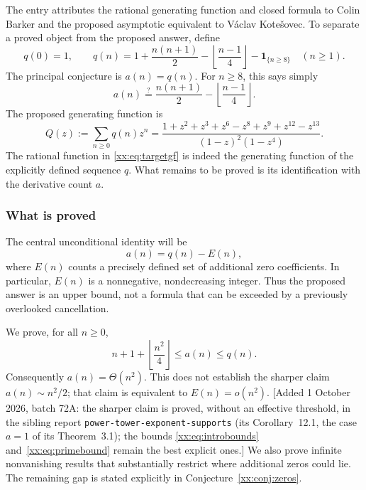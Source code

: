 \documentclass[11pt,a4paper]{article}
\numberwithin{equation}{section}
\theoremstyle{definition}
\theoremstyle{remark}
\theoremstyle{plain}
\newcommand{\ind}[1]{\mathbf{1}_{\{#1\}}}
\newcommand{\sibPTE}{\texttt{power-\allowbreak{}tower-\allowbreak{}exponent-\allowbreak{}supports}}
\begin{document}
The entry attributes the rational generating function and closed formula to
Colin Barker and the proposed asymptotic equivalent to V\'aclav
Kote\v{s}ovec. To separate a proved object from the proposed answer, define
\begin{equation}\label{xx:eq:q}
 q(0)=1,\qquad
 q(n)=1+\frac{n(n+1)}2-\left\lfloor\frac{n-1}{4}\right\rfloor
             -\ind{n\ge8}\quad(n\ge1).
\end{equation}
The principal conjecture is $a(n)=q(n)$. For $n\ge8$, this says simply
\begin{equation}\label{xx:eq:eventual}
 a(n)\stackrel{?}{=}\frac{n(n+1)}2-\left\lfloor\frac{n-1}{4}\right\rfloor.
\end{equation}
The proposed generating function is
\begin{equation}\label{xx:eq:targetgf}
 Q(z):=\sum_{n\ge0}q(n)z^n
 =\frac{1+z^2+z^3+z^6-z^8+z^9+z^{12}-z^{13}}
 {(1-z)^2(1-z^4)}.
\end{equation}
The rational function in \eqref{xx:eq:targetgf} is indeed the generating function
of the explicitly defined sequence $q$. What remains to be proved is its
identification with the derivative count $a$.

\subsubsection{What is proved}
The central unconditional identity will be
\begin{equation}\label{xx:eq:introdefect}
 a(n)=q(n)-E(n),
\end{equation}
where $E(n)$ counts a precisely defined set of additional zero coefficients.
In particular, $E(n)$ is a nonnegative, nondecreasing integer. Thus the
proposed answer is an upper bound, not a formula that can be exceeded by a
previously overlooked cancellation.

We prove, for all $n\ge0$,
\begin{equation}\label{xx:eq:introbounds}
 n+1+\left\lfloor\frac{n^2}{4}\right\rfloor\le a(n)\le q(n).
\end{equation}
Consequently $a(n)=\Theta(n^2)$. This does not establish the sharper claim
$a(n)\sim n^2/2$; that claim is equivalent to $E(n)=o(n^2)$.
[Added 1 October 2026, batch 72A: the sharper claim is proved, without an effective
threshold, in the sibling report \sibPTE{} (its Corollary~12.1, the case
$a=1$ of its Theorem~3.1); the bounds \eqref{xx:eq:introbounds}
and~\eqref{xx:eq:primebound} remain the best explicit ones.]
We also prove infinite nonvanishing results that substantially restrict where
additional zeros could lie. The remaining gap is stated explicitly in
Conjecture~\ref{xx:conj:zeros}.
\end{document}
